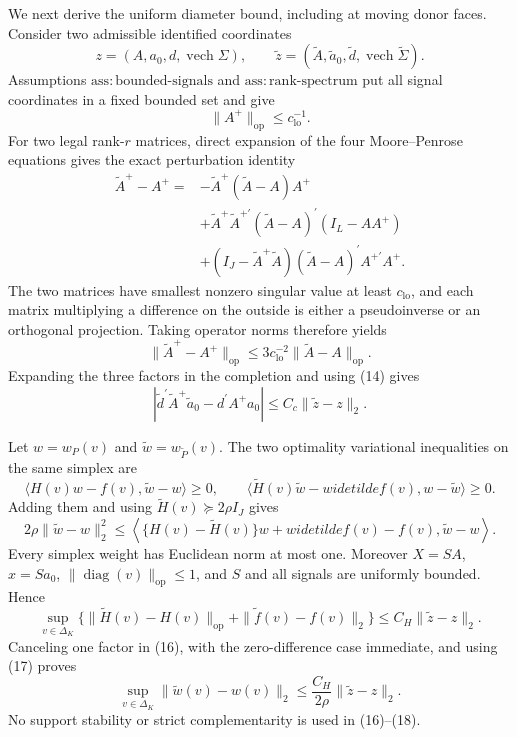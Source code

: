 We next derive the uniform diameter bound, including at moving donor faces.  Consider two admissible identified coordinates
\[
z=(A,a_0,d,\operatorname{vech}\Sigma),\qquad
\widetilde z=(\widetilde A,\widetilde a_0,
\widetilde d,\operatorname{vech}\widetilde\Sigma).
\]
Assumptions \(\mathrm{ass:bounded\mbox{-}signals}\) and \(\mathrm{ass:rank\mbox{-}spectrum}\) put all signal coordinates in a fixed bounded set and give
\[
\|A^+\|_{\mathrm{op}}\leq c_{\mathrm{lo}}^{-1}.
\]
For two legal rank-\(r\) matrices, direct expansion of the four Moore--Penrose equations gives the exact perturbation identity
\[
\begin{split}
\widetilde A^+-A^+
={}&-\widetilde A^+(\widetilde A-A)A^+\\
&+\widetilde A^+\widetilde A^{+\prime}
(\widetilde A-A)^{\prime}(I_L-AA^+)\\
&+(I_J-\widetilde A^+\widetilde A)
(\widetilde A-A)^{\prime}A^{+\prime}A^+.
\end{split}
\]
The two matrices have smallest nonzero singular value at least \(c_{\mathrm{lo}}\), and each matrix multiplying a difference on the outside is either a pseudoinverse or an orthogonal projection.  Taking operator norms therefore yields
\[
\|\widetilde A^+-A^+\|_{\mathrm{op}}
\leq 3c_{\mathrm{lo}}^{-2}
\|\widetilde A-A\|_{\mathrm{op}}.
\tag{14}
\]
Expanding the three factors in the completion and using (14) gives
\[
|\widetilde d^{\prime}\widetilde A^+\widetilde a_0
-d^{\prime}A^+a_0|
\leq C_c\|\widetilde z-z\|_2.
\tag{15}
\]

Let \(w=w_P(v)\) and \(\widetilde w=w_{\widetilde P}(v)\).  The two optimality variational inequalities on the same simplex are
\[
\langle H(v)w-f(v),\widetilde w-w\rangle\geq0,
\qquad
\langle\widetilde H(v)\widetilde w-widetilde f(v),
w-\widetilde w\rangle\geq0.
\]
Adding them and using \(\widetilde H(v)\succeq2\rho I_J\) gives
\[
2\rho\|\widetilde w-w\|_2^2
\leq
\left\langle
\{H(v)-\widetilde H(v)\}w+widetilde f(v)-f(v),
\widetilde w-w
\right\rangle.
\tag{16}
\]
Every simplex weight has Euclidean norm at most one.  Moreover \(X=SA\), \(x=Sa_0\), \(\|\operatorname{diag}(v)\|_{\mathrm{op}}\leq1\), and \(S\) and all signals are uniformly bounded.  Hence
\[
\sup_{v\in\Delta_K}
\{\|\widetilde H(v)-H(v)\|_{\mathrm{op}}
+\|\widetilde f(v)-f(v)\|_2\}
\leq C_H\|\widetilde z-z\|_2.
\tag{17}
\]
Canceling one factor in (16), with the zero-difference case immediate, and using (17) proves
\[
\sup_{v\in\Delta_K}\|\widetilde w(v)-w(v)\|_2
\leq \frac{C_H}{2\rho}\|\widetilde z-z\|_2.
\tag{18}
\]
No support stability or strict complementarity is used in (16)--(18).


